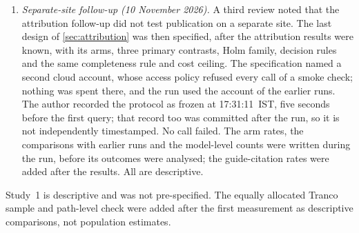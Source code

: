 \begin{enumerate}
  the model resembles the instruction condition; the outside reviewer has one plain name instead of coded ones; the
  ceiling rose from \$9 to \$10, with per-model caps based on each model's usual cost rather than one smoke-test answer;
  and the twelve models ran in parallel, one process each. The protocol was recorded as frozen at 14:24~IST and the first
  query ran at 14:24:35~IST, so the public record cannot order the two to the minute, and that record was committed after
  the run. Failed calls were not retried, and one model fell below the completeness rule and is excluded. The arm rates,
  the baseline comparison and the model-level counts were added afterwards and are descriptive.
  \item \emph{Separate-site follow-up (10 November 2026).} A third review noted that the attribution follow-up did not
  test publication on a separate site. The last design of \cref{sec:attribution} was then specified, after the
  attribution results were known, with its arms, three primary contrasts, Holm family, decision rules and the same
  completeness rule and cost ceiling. The specification named a second cloud account, whose access policy refused every
  call of a smoke check; nothing was spent there, and the run used the account of the earlier runs. The author recorded
  the protocol as frozen at 17:31:11~IST, five seconds before the first query; that record too was committed after the
  run, so it is not independently timestamped. No call failed. The arm rates, the comparisons with earlier runs and the model-level counts were written during
  the run, before its outcomes were analysed; the guide-citation rates were added after the results. All are
  descriptive.
\end{enumerate}

Study~1 is descriptive and was not pre-specified. The equally allocated Tranco sample and path-level check were added after the first measurement as descriptive comparisons, not population estimates.


